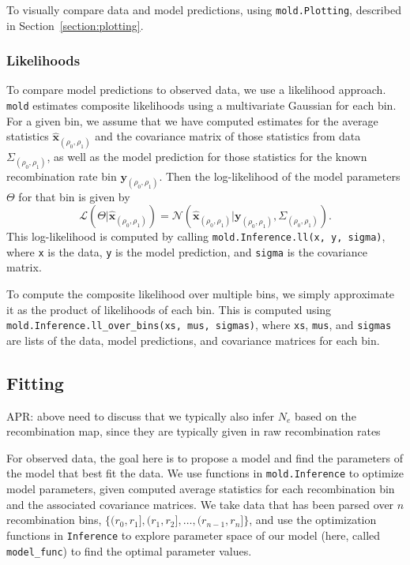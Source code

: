 \documentclass[10pt]{article}
\makeatletter
\newcommand{\comment}[1]{{\color{blue}APR: #1}}
\newcommand{\mold}{\texttt{mold}\xspace}
\newcommand{\py}[1]{\lstinline[breaklines=true,language=Python, showstringspaces=False]@#1@}
\makeatother
\begin{document}
To visually compare data and model predictions, using \py{mold.Plotting}, described in Section~\ref{section:plotting}.

\subsubsection{Likelihoods}

To compare model predictions to observed data, we use a likelihood approach.
\mold estimates composite likelihoods using a multivariate Gaussian for each bin.
For a given bin, we assume that we have computed estimates for the average statistics $\mathbf{\hat{x}}_{(\rho_0,\rho_1)}$ and the covariance matrix of those statistics from data $\Sigma_{(\rho_0,\rho_1)}$, as well as the model prediction for those statistics for the known recombination rate bin $\mathbf{y}_{(\rho_0,\rho_1)}$.
Then the log-likelihood of the model parameters $\Theta$ for that bin is given by
$$\mathcal{L}(\Theta | \mathbf{\hat{x}}_{(\rho_0,\rho_1)}) = \mathcal{N} \left( \mathbf{\hat{x}}_{(\rho_0,\rho_1)} | \mathbf{y}_{(\rho_0,\rho_1)}, \Sigma_{(\rho_0,\rho_1)} \right). $$
This log-likelihood is computed by calling \py{mold.Inference.ll(x, y, sigma)}, where \py{x} is the data, \py{y} is the model prediction, and \py{sigma} is the covariance matrix.

To compute the composite likelihood over multiple bins, we simply approximate it as the product of likelihoods of each bin.
This is computed using \py{mold.Inference.ll_over_bins(xs, mus, sigmas)}, where \py{xs}, \py{mus}, and \py{sigmas} are lists of the data, model predictions, and covariance matrices for each bin.

\subsection{Fitting}

\comment{above need to discuss that we typically also infer $N_e$ based on the recombination map, since they are typically given in raw recombination rates}

For observed data, the goal here is to propose a model and find the parameters of the model that best fit the data.
We use functions in \py{mold.Inference} to optimize model parameters, given computed average statistics for each recombination bin and the associated covariance matrices.
We take data that has been parsed over $n$ recombination bins, $\{(r_0,r_1], (r_1,r_2], \ldots, (r_{n-1},r_n]\}$, and use the optimization functions in \py{Inference} to explore parameter space of our model (here, called \py{model_func}) to find the optimal parameter values.
\end{document}
